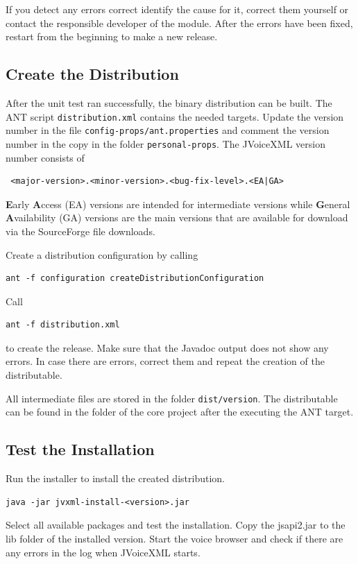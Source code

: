 \documentclass[11pt,a4paper]{article}
\begin{document}
If you detect any errors correct identify the cause for it, correct them
yourself or contact the responsible developer of the module. After the errors
have been fixed, restart from the beginning to make a new release.

\subsection{Create the Distribution}

After the unit test ran successfully, the binary distribution can be built. The
ANT script \texttt{distribution.xml} contains the needed targets.
Update the version number in the file \texttt{config-props/ant.properties}
and comment the version number in the copy in the folder
\texttt{personal-props}. The JVoiceXML version number consists of
\begin{lstlisting}
 <major-version>.<minor-version>.<bug-fix-level>.<EA|GA>
\end{lstlisting}
\textbf{E}arly \textbf{A}ccess (EA) versions are intended for intermediate
versions while \textbf{G}eneral \textbf{A}vailability (GA) versions are the
main versions that are available for download via the SourceForge file
downloads.

Create a distribution configuration by calling
\begin{lstlisting}
ant -f configuration createDistributionConfiguration
\end{lstlisting}

Call
\begin{lstlisting}
ant -f distribution.xml
\end{lstlisting}
to create the release. Make sure that the Javadoc output does not show any
errors. In case there are errors, correct them and repeat the creation of the
distributable.

All intermediate files are stored in the folder \texttt{dist/version}. The
distributable can be found in the folder of the core project after the
executing the ANT target.

\subsection{Test the Installation}

Run the installer to install the created distribution.
\begin{lstlisting}
java -jar jvxml-install-<version>.jar
\end{lstlisting}
Select all available packages and test the installation. 
Copy the jsapi2.jar to the lib folder of the installed version.
Start the voice browser and check if there are any errors in the log when
JVoiceXML starts.
\end{document}
